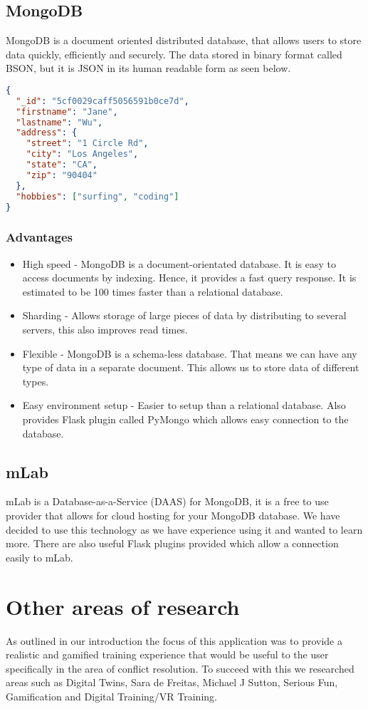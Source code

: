 \subsection{MongoDB}
MongoDB is a document oriented distributed database, that allows users to store data quickly, efficiently and securely. The data stored in binary format called BSON, but it is JSON in its human readable form as seen below.

\begin{lstlisting}[language=JSON]
{
  "_id": "5cf0029caff5056591b0ce7d",
  "firstname": "Jane",
  "lastname": "Wu",
  "address": {
    "street": "1 Circle Rd",
    "city": "Los Angeles",
    "state": "CA",
    "zip": "90404"
  },
  "hobbies": ["surfing", "coding"]
}
\end{lstlisting}

\subsubsection{Advantages}
\begin{itemize}
    \item High speed - MongoDB is a document-orientated database. It is easy to access documents by indexing. Hence, it provides a fast query response. It is estimated to be 100 times faster than a relational database.
    \item Sharding - Allows storage of large pieces of data by distributing to several servers, this also improves read times.
    \item Flexible - MongoDB is a schema-less database. That means we can have any type of data in a separate document. This allows us to store data of different types.
    \item Easy environment setup - Easier to setup than a relational database. Also provides Flask plugin called PyMongo which allows easy connection to the database.
\end{itemize}

\subsection{mLab}
mLab is a Database-as-a-Service (DAAS) for MongoDB, it is a free to use provider that allows for cloud hosting for your MongoDB database. We have decided to use this technology as we have experience using it and wanted to learn more. There are also useful Flask plugins provided which allow a connection easily to mLab.

\section{Other areas of research}
As outlined in our introduction the focus of this application was to provide a realistic and gamified training experience that would be useful to the user specifically in the area of conflict resolution. To succeed with this we researched areas such as Digital Twins, Sara de Freitas, Michael J Sutton, Serious Fun, Gamification and Digital Training/VR Training.